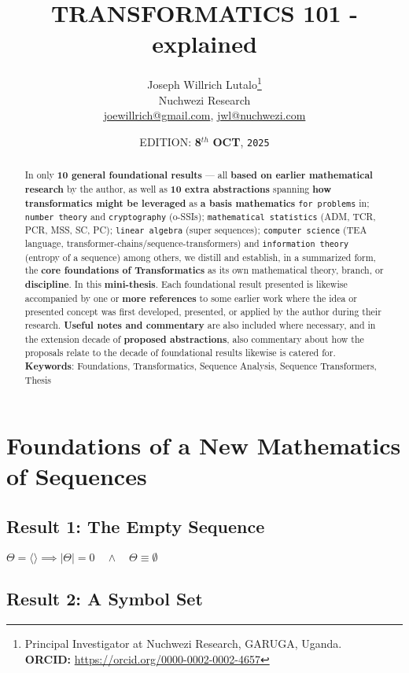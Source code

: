\documentclass[12pt,a4paper]{article}
\title{TRANSFORMATICS 101 - explained}
\author{Joseph Willrich Lutalo\thanks{Principal Investigator at Nuchwezi Research, GARUGA, Uganda.\\ \textbf{ORCID:} \url{https://orcid.org/0000-0002-0002-4657}}\\Nuchwezi Research\\\href{mailto:joewillrich@gmail.com}{joewillrich@gmail.com}, \href{mailto:jwl@nuchwezi.com}{jwl@nuchwezi.com}}
\date {EDITION: \textbf{8}$^{th}$ \textbf{OCT}, \texttt{2025}}
\begin{document}
\maketitle

\begin{abstract}
In only \textbf{10 general foundational results}\cite{Lutalo2025_trans_101}\cite{lutalo_2025_trans101_1page} --- all \textbf{based on earlier mathematical research} by the author, as well as \textbf{10 extra abstractions} spanning \textbf{how transformatics might be leveraged} as \textbf{a basis mathematics} \texttt{for problems} in; \texttt{number theory} and \texttt{cryptography} (o-SSIs); \texttt{mathematical statistics} (ADM, TCR, PCR, MSS, SC, PC); \texttt{linear algebra} (super sequences); \texttt{computer science} (TEA language, transformer-chains/sequence-transformers) and \texttt{information theory} (entropy of a sequence) among others, we distill and establish, in a summarized form, the \textbf{core foundations of Transformatics}\cite{transformatics} as its own mathematical theory, branch, or \textbf{discipline}. In this \textbf{mini-thesis}. Each foundational result presented is likewise accompanied by one or \textbf{more references} to some earlier work where the idea or presented concept was first developed, presented, or applied by the author during their research. \textbf{Useful notes and commentary} are also included where necessary, and in the extension decade of \textbf{proposed abstractions}, also commentary about how the proposals relate to the decade of foundational results likewise is catered for.
 \newline\newline
     \textbf{Keywords}: Foundations, Transformatics, Sequence Analysis,  Sequence Transformers, Thesis
\end{abstract}

\section{Foundations of a New Mathematics of Sequences}
\label{SECFOUND}

\subsection{Result 1: The Empty Sequence\cite{lnspaper}}

$\Theta = \langle \rangle \implies |\Theta| = 0 \quad \land \quad \Theta \equiv \emptyset$

\subsection{Result 2: A Symbol Set\cite{Lutalo2024gtnc}}
\end{document}
